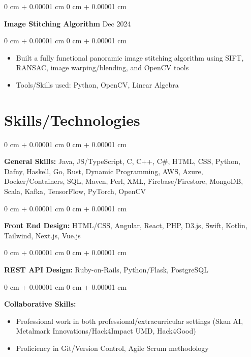 \documentclass[10pt, letterpaper]{article}
\newenvironment{highlights}{
    \begin{itemize}[
        topsep=0.10 cm,
        parsep=0.10 cm,
        partopsep=0pt,
        itemsep=0pt,
        leftmargin=0 cm + 10pt
    ]
}{
    \end{itemize}
} %
\newenvironment{onecolentry}{
    \begin{adjustwidth}{
        0 cm + 0.00001 cm
    }{
        0 cm + 0.00001 cm
    }
}{
    \end{adjustwidth}
} %
\newenvironment{twocolentry}[2][]{
    \onecolentry
    \def\secondColumn{#2}
    \setcolumnwidth{\fill, 4.5 cm}
    \begin{paracol}{2}
}{
    \switchcolumn \raggedleft \secondColumn
    \end{paracol}
    \endonecolentry
} %
\begin{document}
        \vspace{0.2 cm}

        \begin{twocolentry}{
            Dec 2024
        }
            \textbf{Image Stitching Algorithm}\end{twocolentry}

        \vspace{0.10 cm}
        \begin{onecolentry}
            \begin{highlights}
                \item Built a fully functional panoramic image stitching algorithm using SIFT, RANSAC, image warping/blending, and OpenCV tools
                \item Tools/Skills used: Python, OpenCV, Linear Algebra
            \end{highlights}
        \end{onecolentry}



    
    \section{Skills/Technologies}



        
        \begin{onecolentry}
            \textbf{General Skills:} Java, JS/TypeScript, C, C++, C#, HTML, CSS, Python, Dafny, Haskell, Go, Rust, Dynamic Programming, AWS, Azure, Docker/Containers, SQL, Maven, Perl, XML, Firebase/Firestore, MongoDB, Scala, Kafka, TensorFlow, PyTorch, OpenCV \end{onecolentry}

        \vspace{0.2 cm}

        \begin{onecolentry}
            \textbf{Front End Design:} HTML/CSS, Angular, React, PHP, D3.js, Swift, Kotlin, Tailwind, Next.js, Vue.js 
        \end{onecolentry}

        \vspace{0.2 cm}

        \begin{onecolentry}
            \textbf{REST API Design:} Ruby-on-Rails, Python/Flask, PostgreSQL
        \end{onecolentry}
        
        \vspace{0.2 cm}
        
        \begin{onecolentry}
            \textbf{Collaborative Skills:}
            \begin{highlights}
                \item Professional work in both professional/extracurricular settings (Skan AI, Metalmark Innovations/Hack4Impact UMD, Hack4Good)
                \item Proficiency in Git/Version Control, Agile Scrum methodology
            \end{highlights}
        \end{onecolentry}


    
\end{document}
